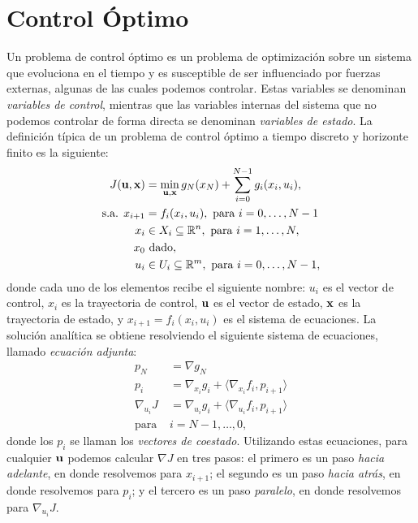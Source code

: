 
\section{Control Óptimo}

Un problema de control óptimo es un problema de optimización sobre un sistema que evoluciona en el tiempo y es susceptible de ser influenciado por fuerzas externas, algunas de las cuales podemos controlar. Estas variables se denominan \emph{variables de control}, mientras que las variables internas del sistema que no podemos controlar de forma directa se denominan \emph{variables de estado}. La definición típica de un problema de control óptimo a tiempo discreto y horizonte finito es la siguiente:
\begin{align*}
	J(\mathbf{u}, \mathbf{x})		&= \min_{\mathbf{u},\mathbf{x}} g_{N}(x_{N}) + \sum_{i=0}^{N-1} g_{i}(x_{i}, u_{i}), \\
	\text{s.a. } x_{i+1}	&= f_{i}(x_{i},u_{i}), \text{ para } i = 0, \dotsc, N-1 \\
	x_{i}					&\in X_{i} \subseteq \mathbb{R}^{n}, \text{ para } i = 1, \dotsc, N,\\
	x_{0}					&\text{ dado,} \\
	u_{i}					&\in U_{i} \subseteq \mathbb{R}^{m}, \text{ para } i = 0, \dotsc, N-1,
\end{align*}
donde cada uno de los elementos recibe el siguiente nombre: \(u_i\) es el vector de control, \(x_i\) es la trayectoria de control, \(\mathbf{u}\) es el vector de estado, \(\mathbf{x}\) es la trayectoria de estado, y \(x_{i+1} = f_{i}(x_{i}, u_{i})\) es el sistema de ecuaciones. La solución analítica se obtiene resolviendo el siguiente sistema de ecuaciones, llamado \emph{ecuación adjunta}:
\begin{align*}
	p_{N}				&= \nabla g_{N} \\
	p_{i}				&= \nabla_{x_{i}} g_{i} + \langle \nabla_{x_{i}} f_{i}, p_{i+1} \rangle \\
	\nabla_{u_{i}} J	&= \nabla_{u_{i}} g_{i} + \langle \nabla_{u_{i}} f_{i}, p_{i+1} \rangle \\
	\text{para }		&i = N-1, \dotsc, 0,
\end{align*}
donde los \(p_{i}\) se llaman los \emph{vectores de coestado}. Utilizando estas ecuaciones, para cualquier \(\mathbf{u}\) podemos calcular \(\nabla J\) en tres pasos: el primero es un paso \emph{hacia adelante}, en donde resolvemos para \(x_{i+1}\); el segundo es un paso \emph{hacia atrás}, en donde resolvemos para \(p_i\); y el tercero es un paso \emph{paralelo}, en donde resolvemos para \(\nabla_{u_i} J\).

